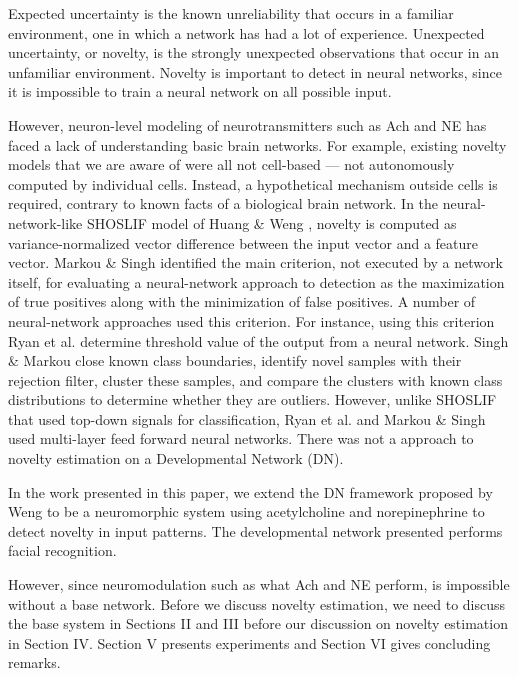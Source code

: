 \documentclass[conference]{IEEEtran}
\begin{document}
Expected uncertainty is the known unreliability that occurs in a familiar environment, one in which a network has had a lot of experience. Unexpected uncertainty, or novelty, is the strongly unexpected observations that occur in an unfamiliar environment. Novelty is important to detect in neural networks, since it is impossible to train a neural network on all possible input.  

However,  neuron-level modeling of neurotransmitters such as Ach and NE has faced a lack of understanding basic brain networks.  For example, existing novelty models that we are aware of were all not cell-based --- not autonomously computed by individual cells. Instead, a hypothetical mechanism outside cells is required, contrary to known facts of a biological brain network.  In the neural-network-like SHOSLIF model of Huang \& Weng \cite{Huang02,Huang07},
novelty is computed as variance-normalized vector difference between the input vector and a feature vector.  Markou \& Singh \cite{Markou03} identified the main criterion,  not executed by a network itself, for evaluating a neural-network approach to detection as the maximization of true positives along with the minimization of false positives.  A number of neural-network approaches used this criterion. For instance, using this criterion Ryan et al. \cite{Ryan98} determine threshold value of the output from a neural network.  Singh \& Markou \cite{Singh04} close known class boundaries, identify novel samples with their rejection filter, cluster these samples, and compare the clusters with known class distributions to determine whether they are outliers. However, unlike SHOSLIF \cite{Huang07} that used top-down signals for classification, 
Ryan et al. \cite{Ryan98} and Markou \& Singh \cite{Singh04} used multi-layer feed forward neural networks. There was not a approach to novelty estimation on a Developmental Network (DN).

In the work presented in this paper, we extend the DN framework proposed by Weng \cite{WengNAI12} to be a neuromorphic system using acetylcholine and norepinephrine to detect novelty in input patterns. The developmental network presented performs facial recognition.    

However, since neuromodulation such as what Ach and NE perform, is impossible without a base network.   Before we discuss novelty estimation, we need to discuss the base system in Sections II and III before our
discussion on novelty estimation in Section IV.   Section V presents experiments and Section VI gives concluding remarks. 
\end{document}
